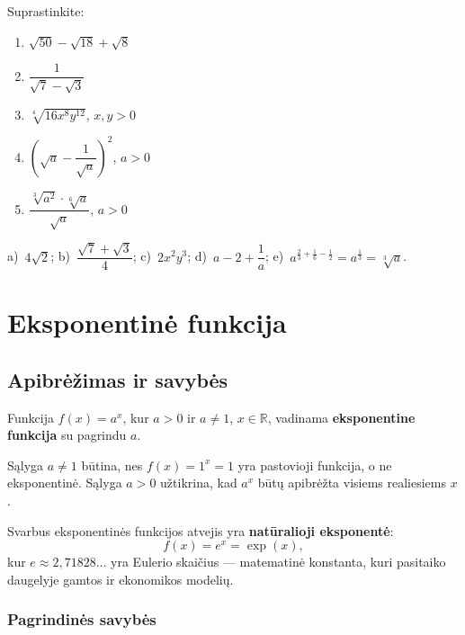 \begin{exercise}
Suprastinkite:
\begin{enumerate}[label=\alph*)]
    \item $\sqrt{50} - \sqrt{18} + \sqrt{8}$
    \item $\dfrac{1}{\sqrt{7}-\sqrt{3}}$
    \item $\sqrt[4]{16x^8y^{12}}$, \quad $x, y > 0$
    \item $\left(\sqrt{a} - \dfrac{1}{\sqrt{a}}\right)^2$, \quad $a > 0$
    \item $\dfrac{\sqrt[3]{a^2} \cdot \sqrt[6]{a}}{\sqrt{a}}$,
          \quad $a > 0$
\end{enumerate}
\end{exercise}

\begin{tcolorbox}[title={Atsakymai}, colback=green!5!white,
                  colframe=green!60!black]
a)~$4\sqrt{2}$;\quad
b)~$\dfrac{\sqrt{7}+\sqrt{3}}{4}$;\quad
c)~$2x^2y^3$;\quad
d)~$a - 2 + \dfrac{1}{a}$;\quad
e)~$a^{\frac{2}{3}+\frac{1}{6}-\frac{1}{2}} = a^{\frac{1}{3}} = \sqrt[3]{a}$.
\end{tcolorbox}


\section{Eksponentinė funkcija}

\subsection{Apibrėžimas ir savybės}

\begin{definition}
Funkcija $f(x) = a^x$, kur $a > 0$ ir $a \neq 1$, $x \in \mathbb{R}$, vadinama
\textbf{eksponentine funkcija} su pagrindu $a$.
\end{definition}

\begin{remark}
Sąlyga $a \neq 1$ būtina, nes $f(x) = 1^x = 1$ yra pastovioji funkcija, o ne
eksponentinė. Sąlyga $a > 0$ užtikrina, kad $a^x$ būtų apibrėžta visiems
realiesiems $x$.
\end{remark}

Svarbus eksponentinės funkcijos atvejis yra \textbf{natūralioji eksponentė}:
\[
f(x) = e^x = \exp(x),
\]
kur $e \approx 2{,}71828\ldots$ yra Eulerio skaičius --- matematinė konstanta,
kuri pasitaiko daugelyje gamtos ir ekonomikos modelių.

\subsubsection*{Pagrindinės savybės}

